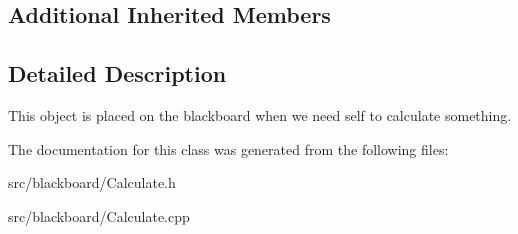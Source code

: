 \subsection*{Additional Inherited Members}


\subsection{Detailed Description}
This object is placed on the blackboard when we need self to calculate something. 

The documentation for this class was generated from the following files\+:\begin{DoxyCompactItemize}
\item 
src/blackboard/Calculate.\+h\item 
src/blackboard/Calculate.\+cpp\end{DoxyCompactItemize}
